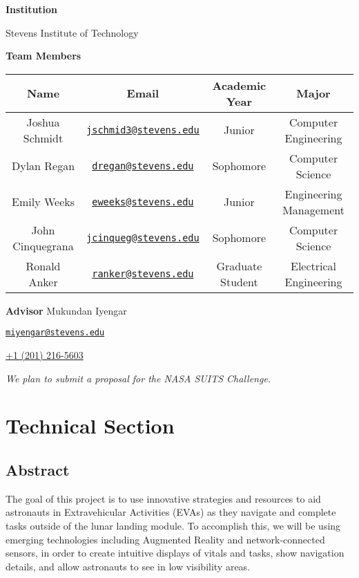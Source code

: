 \documentclass{article}
\let\Oldsection\section
\renewcommand{\section}{\FloatBarrier\Oldsection}
\let\Oldsubsection\subsection
\renewcommand{\subsection}{\FloatBarrier\Oldsubsection}
\newcommand{\schoolname}{Stevens Institute of Technology}
\begin{document}
\begin{center}

\bigskip
\bigskip
\textbf{Institution}

\schoolname

\bigskip

\textbf{Team Members}

\bigskip
\bigskip

\begin{tabular}{||c c c c||} 
 \hline
 Name & Email & Academic Year & Major \\ [0.5ex] 
 \hline\hline
 Joshua Schmidt & \href{mailto:jschmid3@stevens.edu}{\nolinkurl{jschmid3@stevens.edu}} & Junior & Computer Engineering \\ 
 \hline
 Dylan Regan & \href{mailto:dregan@stevens.edu}{\nolinkurl{dregan@stevens.edu}} & Sophomore & Computer Science \\
 \hline
 Emily Weeks & \href{mailto:jschmid3@stevens.edu}{\nolinkurl{eweeks@stevens.edu}} & Junior & Engineering Management\\
 \hline
 John Cinquegrana & \href{mailto:jcinqueg@stevens.edu}{\nolinkurl{jcinqueg@stevens.edu}} & Sophomore & Computer Science \\
 \hline
 Ronald Anker & \href{mailto:ranker@stevens.edu}{\nolinkurl{ranker@stevens.edu}} & Graduate Student & Electrical Engineering \\
 \hline
\end{tabular}

\bigskip
\bigskip

\textbf{Advisor}
\bigskip
Mukundan Iyengar

\href{mailto:miyengar@stevens.edu}{\nolinkurl{miyengar@stevens.edu}}

\href{tel:12012165603}{+1 (201) 216-5603}

\bigskip
\bigskip
\textit{We plan to submit a proposal for the NASA SUITS Challenge.}

\end{center}

\newpage

\section{Technical Section}

\subsection{Abstract}

The goal of this project is to use innovative strategies and resources to aid astronauts in Extravehicular Activities (EVAs) as they navigate and complete tasks outside of the lunar landing module. To accomplish this, we will be using emerging technologies including Augmented Reality and network-connected sensors, in order to create intuitive displays of vitals and tasks, show navigation details, and allow astronauts to see in low visibility areas.
\end{document}
